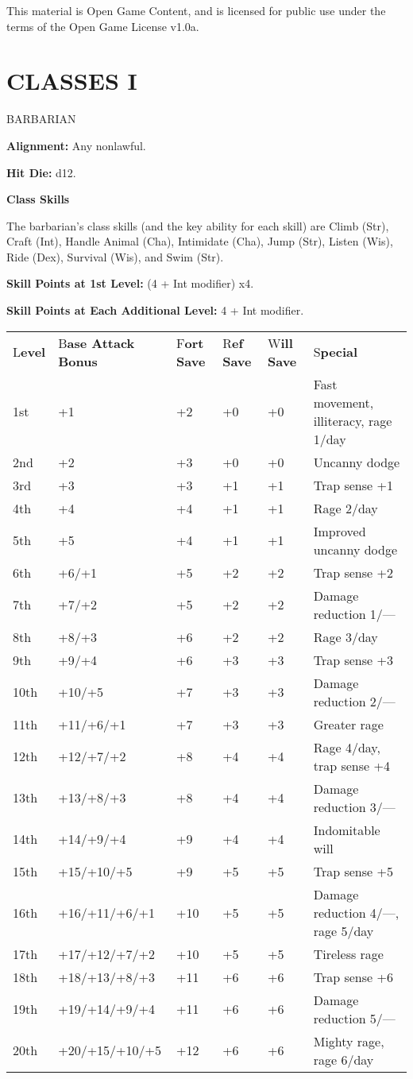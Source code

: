 \documentclass{article}
\begin{document}
This material is Open Game Content, and is licensed for public use under the terms 
of the Open Game License v1.0a.

\section*{{\LARGE{}CLASSES I}}

\vspace{12pt}
{\LARGE{}BARBARIAN}

\textbf{Alignment:} Any nonlawful.

\textbf{Hit Die:} d12.

\vspace{12pt}
\textbf{Class Skills}

The barbarian's class skills (and the key ability for each skill) are Climb (Str), 
Craft (Int), Handle Animal (Cha), Intimidate (Cha), Jump (Str), Listen (Wis), Ride 
(Dex), Survival (Wis), and Swim (Str).

\textbf{Skill Points at 1st Level:} (4 + Int modifier) x$ $4.

\textbf{Skill Points at Each Additional Level:} 4 + Int modifier.

\vspace{12pt}
\begin{tabular}{|>{\raggedright}p{20pt}|>{\raggedright}p{52pt}|>{\raggedright}p{28pt}|>{\raggedright}p{25pt}|>{\raggedright}p{28pt}|>{\raggedright}p{123pt}|}
\hline
\multicolumn{6}{|p{278pt}|}{
T\textbf{able: The Barbarian}}\tabularnewline
\hline
L\textbf{evel } & B\textbf{ase Attack Bonus } & F\textbf{ort Save } & R\textbf{ef 
Save } & W\textbf{ill Save } & S\textbf{pecial}\tabularnewline
\hline
1st  & +1  & +2  & +0  & +0  & Fast movement, illiteracy, rage 1/day\tabularnewline
\hline
2nd & +2 & +3 & +0 & +0 & Uncanny dodge\tabularnewline
\hline
3rd & +3 & +3 & +1 & +1 & Trap sense +1\tabularnewline
\hline
4th & +4 & +4 & +1 & +1 & Rage 2/day\tabularnewline
\hline
5th & +5 & +4 & +1 & +1 & Improved uncanny dodge\tabularnewline
\hline
6th & +6/+1 & +5 & +2 & +2 & Trap sense +2\tabularnewline
\hline
7th & +7/+2 & +5 & +2 & +2 & Damage reduction 1/---\tabularnewline
\hline
8th & +8/+3 & +6 & +2 & +2 & Rage 3/day\tabularnewline
\hline
9th & +9/+4 & +6 & +3 & +3 & Trap sense +3\tabularnewline
\hline
10th & +10/+5 & +7 & +3 & +3 & Damage reduction 2/---\tabularnewline
\hline
11th & +11/+6/+1 & +7 & +3 & +3 & Greater rage\tabularnewline
\hline
12th & +12/+7/+2 & +8 & +4 & +4 & Rage 4/day, trap sense +4\tabularnewline
\hline
13th & +13/+8/+3 & +8 & +4 & +4 & Damage reduction 3/---\tabularnewline
\hline
14th & +14/+9/+4 & +9 & +4 & +4 & Indomitable will\tabularnewline
\hline
15th & +15/+10/+5 & +9 & +5 & +5 & Trap sense +5\tabularnewline
\hline
16th & +16/+11/+6/+1 & +10 & +5 & +5 & Damage reduction 4/---, rage 5/day\tabularnewline
\hline
17th & +17/+12/+7/+2 & +10 & +5 & +5 & Tireless rage\tabularnewline
\hline
18th & +18/+13/+8/+3 & +11 & +6 & +6 & Trap sense +6\tabularnewline
\hline
19th & +19/+14/+9/+4 & +11 & +6 & +6 & Damage reduction 5/---\tabularnewline
\hline
20th & +20/+15/+10/+5 & +12 & +6 & +6 & Mighty rage, rage 6/day\tabularnewline
\hline
\end{tabular}
\end{document}
